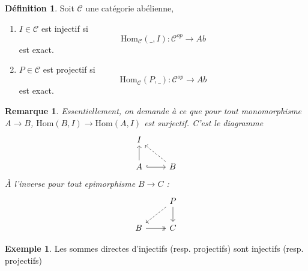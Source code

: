 \documentclass[a4paper,12pt]{book}
\newcommand{\Cat}{\mathcal{C}}
\newcommand{\Hom}{\textrm{Hom}}
\theoremstyle{plain}
\newtheorem{rem}{Remarque}
\theoremstyle{definition}
\newtheorem{defn}[subsection]{Définition}
\newtheorem{ex}[subsection]{Exemple}
\theoremstyle{remark}
\begin{document}
\begin{defn}
    Soit $\Cat$ une catégorie abélienne,
    \begin{enumerate}
	\item $I\in\Cat$ est injectif si 
	    \[\Hom_{\Cat}(\_,I)\colon\Cat^{op}\to Ab\]
	    est exact.
	\item $P\in\Cat$ est projectif si 
	    \[\Hom_{\Cat}(P,\_)\colon\Cat^{op}\to Ab\]
	    est exact.
    \end{enumerate}
\end{defn}
\begin{rem}
    Essentiellement, on demande à ce que pour tout monomorphisme
    $A\to B$, $\Hom(B,I)\to\Hom(A,I)$ est surjectif. C'est le
    diagramme
\[\begin{tikzcd}
	I \\
	A & B
	\arrow[from=2-1, to=1-1]
	\arrow[hook, from=2-1, to=2-2]
	\arrow[dashed, from=2-2, to=1-1]
\end{tikzcd}\]
    À l'inverse pour tout epimorphisme $B\to C$ :
\[\begin{tikzcd}
	& P \\
	B & C
	\arrow[dashed, from=1-2, to=2-1]
	\arrow[from=1-2, to=2-2]
	\arrow[two heads, from=2-1, to=2-2]
\end{tikzcd}\]
\end{rem}

\begin{ex}
    Les sommes directes d'injectifs (resp. projectifs) sont injectifs
    (resp. projectifs)
\end{ex}
\end{document}
